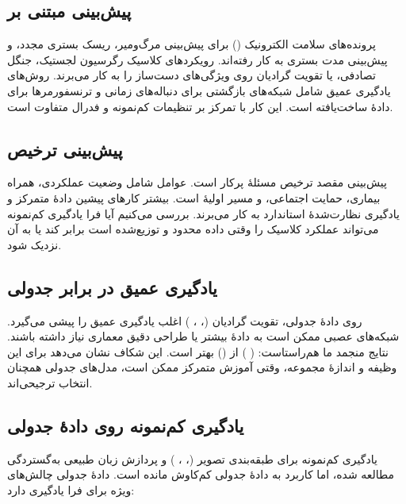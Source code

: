 \subsection{پیش‌بینی مبتنی بر }

پرونده‌های سلامت الکترونیک () برای پیش‌بینی مرگ‌ومیر، ریسک بستری مجدد، و پیش‌بینی مدت بستری به کار رفته‌اند. رویکردهای کلاسیک رگرسیون لجستیک، جنگل تصادفی، یا تقویت گرادیان روی ویژگی‌های دست‌ساز را به کار می‌برند. روش‌های یادگیری عمیق شامل شبکه‌های بازگشتی برای دنباله‌های زمانی و ترنسفورمرها برای دادۀ ساخت‌یافته است. این کار با تمرکز بر تنظیمات کم‌نمونه و فدرال متفاوت است.

\subsection{پیش‌بینی ترخیص}

پیش‌بینی مقصد ترخیص مسئلۀ پرکار است. عوامل شامل وضعیت عملکردی، همراه بیماری، حمایت اجتماعی، و مسیر اولیۀ  است. بیشتر کارهای پیشین دادۀ متمرکز و یادگیری نظارت‌شدۀ استاندارد به کار می‌برند. بررسی می‌کنیم آیا فرا یادگیری کم‌نمونه می‌تواند عملکرد کلاسیک را وقتی داده محدود و توزیع‌شده است برابر کند یا به آن نزدیک شود.

\subsection{یادگیری عمیق در برابر جدولی}

روی دادۀ جدولی، تقویت گرادیان (، ، ) اغلب یادگیری عمیق را پیشی می‌گیرد. شبکه‌های عصبی ممکن است به دادۀ بیشتر یا طراحی دقیق معماری نیاز داشته باشند. نتایج منجمد  ما هم‌راستاست:  ( ) از \texttt{} () بهتر است. این شکاف نشان می‌دهد برای این وظیفه و اندازۀ مجموعه، وقتی آموزش متمرکز ممکن است، مدل‌های جدولی همچنان انتخاب ترجیحی‌اند.

\subsection{یادگیری کم‌نمونه روی دادۀ جدولی}

یادگیری کم‌نمونه برای طبقه‌بندی تصویر (، ، ) و پردازش زبان طبیعی به‌گستردگی مطالعه شده، اما کاربرد به دادۀ جدولی کم‌کاوش مانده است. دادۀ جدولی چالش‌های ویژه برای فرا یادگیری دارد:

